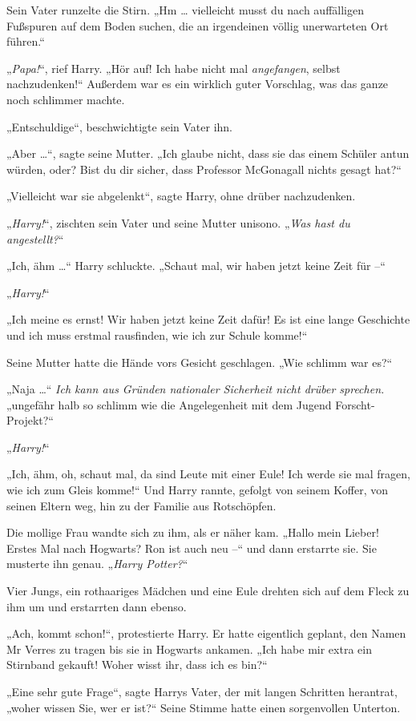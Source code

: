 {Sein Vater runzelte die Stirn. „Hm … vielleicht musst du nach auffälligen Fußspuren auf dem Boden suchen, die an irgendeinen völlig unerwarteten Ort führen.“

„\emph{Papa!}“, rief Harry. „Hör auf! Ich habe nicht mal \emph{angefangen}, selbst nachzudenken!“ Außerdem war es ein wirklich guter Vorschlag, was das ganze noch schlimmer machte.

„Entschuldige“, beschwichtigte sein Vater ihn.

„Aber …“, sagte seine Mutter. „Ich glaube nicht, dass sie das einem Schüler antun würden, oder? Bist du dir sicher, dass Professor McGonagall nichts gesagt hat?“

„Vielleicht war sie abgelenkt“, sagte Harry, ohne drüber nachzudenken.

„\emph{Harry!}“, zischten sein Vater und seine Mutter unisono. „\emph{Was hast du angestellt?}“

„Ich, ähm …“ Harry schluckte. „Schaut mal, wir haben jetzt keine Zeit für --“

„\emph{Harry!}“

„Ich meine es ernst! Wir haben jetzt keine Zeit dafür! Es ist eine lange Geschichte und ich muss erstmal rausfinden, wie ich zur Schule komme!“

Seine Mutter hatte die Hände vors Gesicht geschlagen. „Wie schlimm war es?“

„Naja …“ \emph{Ich kann aus Gründen nationaler Sicherheit nicht drüber sprechen.} „ungefähr halb so schlimm wie die Angelegenheit mit dem Jugend Forscht-Projekt?“

„\emph{Harry!}“

„Ich, ähm, oh, schaut mal, da sind Leute mit einer Eule! Ich werde sie mal fragen, wie ich zum Gleis komme!“ Und Harry rannte, gefolgt von seinem Koffer, von seinen Eltern weg, hin zu der Familie aus Rotschöpfen.

Die mollige Frau wandte sich zu ihm, als er näher kam. „Hallo mein Lieber! Erstes Mal nach Hogwarts? Ron ist auch neu --“ und dann erstarrte sie. Sie musterte ihn genau. „\emph{Harry Potter?}“

Vier Jungs, ein rothaariges Mädchen und eine Eule drehten sich auf dem Fleck zu ihm um und erstarrten dann ebenso.

„Ach, kommt schon!“, protestierte Harry. Er hatte eigentlich geplant, den Namen Mr Verres zu tragen bis sie in Hogwarts ankamen. „Ich habe mir extra ein Stirnband gekauft! Woher wisst ihr, dass ich es bin?“

„Eine sehr gute Frage“, sagte Harrys Vater, der mit langen Schritten herantrat, „woher wissen Sie, wer er ist?“ Seine Stimme hatte einen sorgenvollen Unterton.

}
